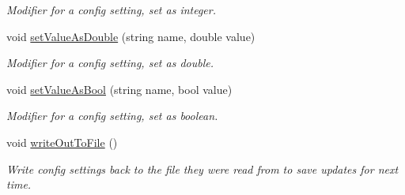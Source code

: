 \begin{DoxyCompactItemize}
\begin{DoxyCompactList}\small\item\em Modifier for a config setting, set as integer. \end{DoxyCompactList}\item 
void \hyperlink{class_config_ae8fb7ed4ec7a7b88038cd061469b0c8b}{setValueAsDouble} (string name, double value)
\begin{DoxyCompactList}\small\item\em Modifier for a config setting, set as double. \end{DoxyCompactList}\item 
void \hyperlink{class_config_aaa1700e1cc4740270f54a117a4538050}{setValueAsBool} (string name, bool value)
\begin{DoxyCompactList}\small\item\em Modifier for a config setting, set as boolean. \end{DoxyCompactList}\item 
\hypertarget{class_config_a58e255bcac080cf9ad2f7a95af7f40db}{
void \hyperlink{class_config_a58e255bcac080cf9ad2f7a95af7f40db}{writeOutToFile} ()}
\label{class_config_a58e255bcac080cf9ad2f7a95af7f40db}

\begin{DoxyCompactList}\small\item\em Write config settings back to the file they were read from to save updates for next time. \end{DoxyCompactList}\end{DoxyCompactItemize}
